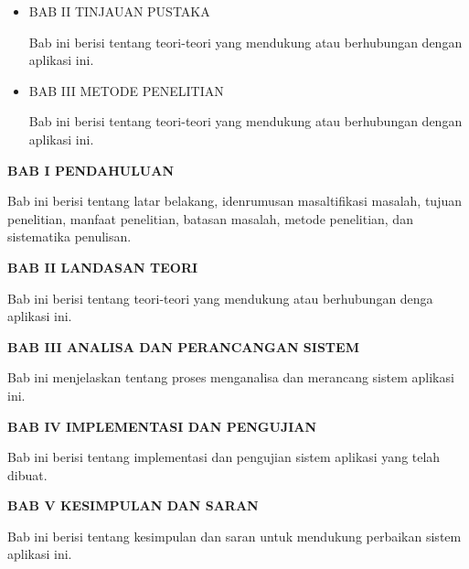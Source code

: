 \begin{flushleft}
\begin{itemize}
  \item \noindent BAB II TINJAUAN PUSTAKA
  \begin{justify}
    Bab ini berisi tentang teori-teori yang mendukung atau berhubungan dengan aplikasi ini.

  \end{justify}
\end{itemize}

\begin{itemize}
  \item \noindent BAB III METODE PENELITIAN
  \begin{justify}
    Bab ini berisi tentang teori-teori yang mendukung atau berhubungan dengan aplikasi ini.

  \end{justify}
\end{itemize}


 \noindent \textbf{BAB I \hspace{1cm} PENDAHULUAN}
\begin{addmargin}[2.35cm]{0em}
Bab ini berisi tentang latar belakang, idenrumusan masaltifikasi masalah, tujuan penelitian, manfaat penelitian, batasan masalah, metode penelitian, dan sistematika penulisan.
\end{addmargin}
\noindent \textbf{BAB II \hspace{0.8cm} LANDASAN TEORI}
\begin{addmargin}[2.35cm]{0em}
Bab ini berisi tentang teori-teori yang mendukung atau berhubungan denga aplikasi ini.
\end{addmargin}
\noindent \textbf{BAB III \hspace{0.7cm} ANALISA DAN PERANCANGAN SISTEM}
\begin{addmargin}[2.35cm]{0em}
Bab ini menjelaskan tentang proses menganalisa dan merancang sistem aplikasi ini.
\end{addmargin}
\noindent \textbf{BAB IV \hspace{0.7cm} IMPLEMENTASI DAN PENGUJIAN}
\begin{addmargin}[2.35cm]{0em}
Bab ini berisi tentang implementasi dan pengujian sistem aplikasi yang telah dibuat.
\end{addmargin}
\noindent \textbf{BAB V \hspace{0.8cm} KESIMPULAN DAN SARAN}
\begin{addmargin}[2.35cm]{0em}
Bab ini berisi tentang kesimpulan dan saran untuk mendukung perbaikan sistem aplikasi ini.
\end{addmargin}


\end{flushleft}



\newpage